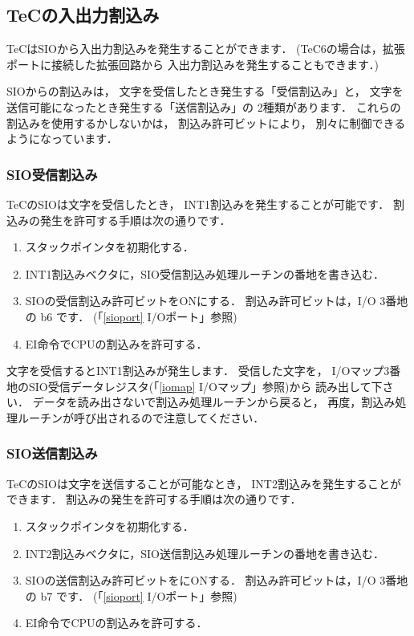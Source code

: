 \subsection{TeCの入出力割込み}

TeCはSIOから入出力割込みを発生することができます．
(TeC6の場合は，拡張ポートに接続した拡張回路から
入出力割込みを発生することもできます．)

SIOからの割込みは，
文字を受信したとき発生する「受信割込み」と，
文字を送信可能になったとき発生する「送信割込み」の
2種類があります．
これらの割込みを使用するかしないかは，
割込み許可ビットにより，
別々に制御できるようになっています．

\subsubsection{SIO受信割込み}

TeCのSIOは文字を受信したとき，
INT1割込みを発生することが可能です．
割込みの発生を許可する手順は次の通りです．

\begin{enumerate}
\item スタックポインタを初期化する．
\item INT1割込みベクタに，SIO受信割込み処理ルーチンの番地を書き込む．
\item SIOの受信割込み許可ビットをONにする．
割込み許可ビットは，I/O 3番地の b6 です．
(「\ref{sioport} I/Oポート」参照)
\item EI命令でCPUの割込みを許可する．
\end{enumerate}

文字を受信するとINT1割込みが発生します．
受信した文字を，
I/Oマップ3番地のSIO受信データレジスタ(「\ref{iomap} I/Oマップ」参照)から
読み出して下さい．
データを読み出さないで割込み処理ルーチンから戻ると，
再度，割込み処理ルーチンが呼び出されるので注意してください．

\subsubsection{SIO送信割込み}

TeCのSIOは文字を送信することが可能なとき，
INT2割込みを発生することができます．
割込みの発生を許可する手順は次の通りです．

\begin{enumerate}
\item スタックポインタを初期化する．
\item INT2割込みベクタに，SIO送信割込み処理ルーチンの番地を書き込む．
\item SIOの送信割込み許可ビットをにONする．
割込み許可ビットは，I/O 3番地の b7 です．
(「\ref{sioport} I/Oポート」参照)
\item EI命令でCPUの割込みを許可する．
\end{enumerate}

